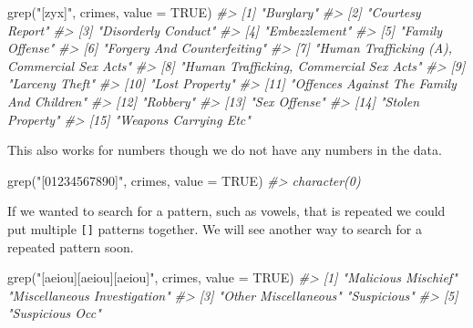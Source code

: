 \documentclass[
]{krantz}
\makeatletter
\newenvironment{Shaded}{\begin{snugshade}}{\end{snugshade}}
\newcommand{\AttributeTok}[1]{\textcolor[rgb]{0.61,0.61,0.61}{#1}}
\newcommand{\CommentTok}[1]{\textcolor[rgb]{0.37,0.37,0.37}{\textit{#1}}}
\newcommand{\ConstantTok}[1]{\textcolor[rgb]{0,0,0}{#1}}
\newcommand{\FunctionTok}[1]{\textcolor[rgb]{0,0,0}{#1}}
\newcommand{\NormalTok}[1]{#1}
\newcommand{\StringTok}[1]{\textcolor[rgb]{0.5,0.5,0.5}{#1}}
\newenvironment{kframe}{%
\medskip{}
\setlength{\fboxsep}{.8em}
 \def\at@end@of@kframe{}%
 \ifinner\ifhmode%
  \def\at@end@of@kframe{\end{minipage}}%
  \begin{minipage}{\columnwidth}%
 \fi\fi%
 \def\FrameCommand##1{\hskip\@totalleftmargin \hskip-\fboxsep
 \colorbox{shadecolor}{##1}\hskip-\fboxsep
     \hskip-\linewidth \hskip-\@totalleftmargin \hskip\columnwidth}%
 \MakeFramed {\advance\hsize-\width
   \@totalleftmargin\z@ \linewidth\hsize
   \@setminipage}}%
 {\par\unskip\endMakeFramed%
 \at@end@of@kframe}
\renewenvironment{Shaded}{\begin{kframe}}{\end{kframe}}
\makeatother
\begin{document}
\begin{Shaded}
\begin{Highlighting}[]
\FunctionTok{grep}\NormalTok{(}\StringTok{"[zyx]"}\NormalTok{, crimes, }\AttributeTok{value =} \ConstantTok{TRUE}\NormalTok{)}
\CommentTok{\#\textgreater{}  [1] "Burglary"                                  }
\CommentTok{\#\textgreater{}  [2] "Courtesy Report"                           }
\CommentTok{\#\textgreater{}  [3] "Disorderly Conduct"                        }
\CommentTok{\#\textgreater{}  [4] "Embezzlement"                              }
\CommentTok{\#\textgreater{}  [5] "Family Offense"                            }
\CommentTok{\#\textgreater{}  [6] "Forgery And Counterfeiting"                }
\CommentTok{\#\textgreater{}  [7] "Human Trafficking (A), Commercial Sex Acts"}
\CommentTok{\#\textgreater{}  [8] "Human Trafficking, Commercial Sex Acts"    }
\CommentTok{\#\textgreater{}  [9] "Larceny Theft"                             }
\CommentTok{\#\textgreater{} [10] "Lost Property"                             }
\CommentTok{\#\textgreater{} [11] "Offences Against The Family And Children"  }
\CommentTok{\#\textgreater{} [12] "Robbery"                                   }
\CommentTok{\#\textgreater{} [13] "Sex Offense"                               }
\CommentTok{\#\textgreater{} [14] "Stolen Property"                           }
\CommentTok{\#\textgreater{} [15] "Weapons Carrying Etc"}
\end{Highlighting}
\end{Shaded}

This also works for numbers though we do not have any numbers in the data.

\begin{Shaded}
\begin{Highlighting}[]
\FunctionTok{grep}\NormalTok{(}\StringTok{"[01234567890]"}\NormalTok{, crimes, }\AttributeTok{value =} \ConstantTok{TRUE}\NormalTok{)}
\CommentTok{\#\textgreater{} character(0)}
\end{Highlighting}
\end{Shaded}

If we wanted to search for a pattern, such as vowels, that is repeated we could put multiple \texttt{{[}{]}} patterns together. We will see another way to search for a repeated pattern soon.

\begin{Shaded}
\begin{Highlighting}[]
\FunctionTok{grep}\NormalTok{(}\StringTok{"[aeiou][aeiou][aeiou]"}\NormalTok{, crimes, }\AttributeTok{value =} \ConstantTok{TRUE}\NormalTok{)}
\CommentTok{\#\textgreater{} [1] "Malicious Mischief"          "Miscellaneous Investigation"}
\CommentTok{\#\textgreater{} [3] "Other Miscellaneous"         "Suspicious"                 }
\CommentTok{\#\textgreater{} [5] "Suspicious Occ"}
\end{Highlighting}
\end{Shaded}
\end{document}
